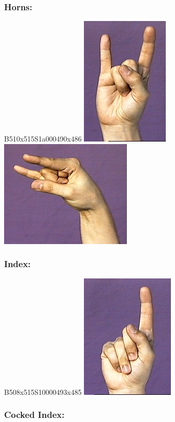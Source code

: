 \documentclass{article}
\begin{document}
\subsubsection{Horns:}

B510x515S1a000490x486
\includegraphics[scale=0.5]{images/horns1.jpg}
\includegraphics[scale=0.5]{images/horns2.jpg}

\subsubsection{Index:}

B508x515S10000493x485
\includegraphics[scale=0.5]{images/indexfingerb.jpg}

\subsubsection{Cocked Index:}
\end{document}
